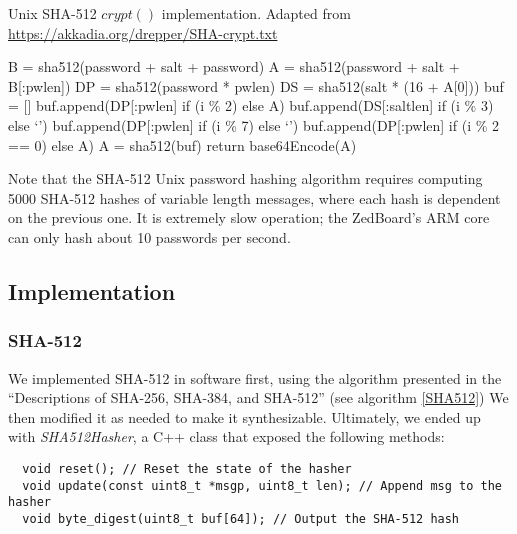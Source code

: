 \begin{algorithm}[!htb]
  \label{SHA512-unix}
  \caption{Unix SHA-512 $crypt()$ implementation. Adapted from \url{https://akkadia.org/drepper/SHA-crypt.txt}}
  \begin{algorithmic}
    \State B = sha512(password + salt + password)
    \State A = sha512(password + salt + B[:pwlen])
    \State DP = sha512(password * pwlen)
    \State DS = sha512(salt * (16 + A[0]))
      \State buf = []
      \State buf.append(DP[:pwlen] if (i \% 2) else A)
      \State buf.append(DS[:saltlen] if (i \% 3) else ‘’)
      \State buf.append(DP[:pwlen] if (i \% 7) else ‘’)
      \State buf.append(DP[:pwlen] if (i \% 2 == 0) else A)
      \State A = sha512(buf)
    \EndFor
    \State return base64Encode(A)
    \EndProcedure
  \end{algorithmic}
\end{algorithm}

Note that the SHA-512 Unix password hashing algorithm requires computing 5000
SHA-512 hashes of variable length messages, where each hash is dependent on the previous one.
It is extremely slow operation; the ZedBoard's ARM core can only hash about 10 passwords per second.

\subsection{Implementation}
\subsubsection{SHA-512}
We implemented SHA-512 in software first, using the algorithm presented in the ``Descriptions of SHA-256, SHA-384, and SHA-512'' (see algorithm \ref{SHA512})
We then modified it as needed to make it synthesizable. Ultimately, we ended up with \emph{SHA512Hasher}, a C++ class that exposed the following methods:
\begin{verbatim}
  void reset(); // Reset the state of the hasher
  void update(const uint8_t *msgp, uint8_t len); // Append msg to the hasher
  void byte_digest(uint8_t buf[64]); // Output the SHA-512 hash
\end{verbatim}

